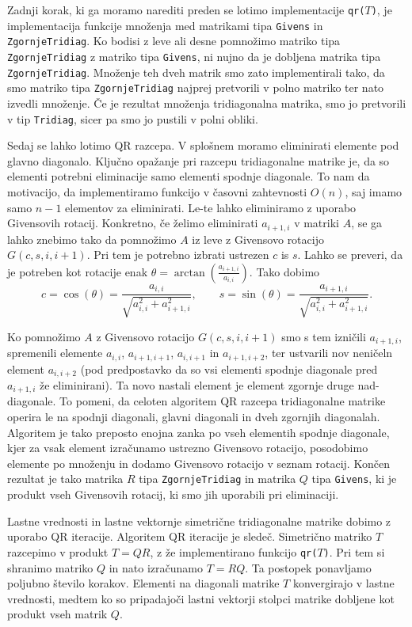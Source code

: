 \documentclass[11pt, titlepage]{article}
\begin{document}
Zadnji korak, ki ga moramo narediti preden se lotimo implementacije \texttt{qr($T$)}, je implementacija funkcije množenja med matrikami tipa \texttt{Givens} in \texttt{ZgornjeTridiag}. Ko bodisi z leve ali desne pomnožimo matriko tipa \texttt{ZgornjeTridiag}
z matriko tipa \texttt{Givens}, ni nujno da je dobljena matrika tipa \texttt{ZgornjeTridiag}. Množenje teh dveh matrik smo zato implementirali tako, da smo matriko tipa \texttt{ZgornjeTridiag} najprej pretvorili v polno matriko ter
nato izvedli množenje. Če je rezultat množenja tridiagonalna matrika, smo jo pretvorili v tip \texttt{Tridiag}, sicer pa smo jo pustili v polni obliki.

Sedaj se lahko lotimo QR razcepa. V splošnem moramo eliminirati elemente pod glavno diagonalo. Ključno opažanje pri razcepu tridiagonalne matrike je, da so elementi potrebni eliminacije samo elementi spodnje diagonale.
To nam da motivacijo, da implementiramo funkcijo v časovni zahtevnosti $O(n)$, saj imamo samo $n-1$ elementov za eliminirati. Le-te lahko eliminiramo z uporabo Givensovih rotacij.
Konkretno, če želimo eliminirati $a_{i+1,i}$ v matriki $A$, se ga lahko znebimo tako da pomnožimo $A$ iz leve z Givensovo rotacijo $G(c,s,i,i+1)$. Pri tem je potrebno izbrati ustrezen $c$ is $s$.
Lahko se preveri, da je potreben kot rotacije enak $\theta = \arctan\left(\frac{a_{i+1,i}}{a_{i,i}}\right)$. Tako dobimo
$$
c = \cos(\theta) = \frac{a_{i,i}}{\sqrt{a_{i,i}^2 + a_{i+1,i}^2}}, \qquad s = \sin(\theta) = \frac{a_{i+1,i}}{\sqrt{a_{i,i}^2 + a_{i+1,i}^2}}.
$$ 

Ko pomnožimo $A$ z Givensovo rotacijo $G(c,s,i,i+1)$ smo s tem izničili $a_{i+1,i}$, spremenili elemente $a_{i,i}$, $a_{i+1,i+1}$, $a_{i,i+1}$ in $a_{i+1,i+2}$, ter ustvarili nov neničeln element $a_{i,i+2}$ (pod predpostavko da so vsi elementi spodnje diagonale pred $a_{i+1,i}$ že eliminirani). Ta novo nastali element je element zgornje druge nad-diagonale.
To pomeni, da celoten algoritem QR razcepa tridiagonalne matrike operira le na spodnji diagonali, glavni diagonali in dveh zgornjih diagonalah.
Algoritem je tako preposto enojna zanka po vseh elementih spodnje diagonale, kjer za vsak element izračunamo ustrezno Givensovo rotacijo, posodobimo elemente po množenju in dodamo Givensovo rotacijo v seznam rotacij.
Končen rezultat je tako matrika $R$ tipa \texttt{ZgornjeTridiag} in matrika $Q$ tipa \texttt{Givens}, ki je produkt vseh Givensovih rotacij, ki smo jih uporabili pri eliminaciji.

Lastne vrednosti in lastne vektornje simetrične tridiagonalne matrike dobimo z uporabo QR iteracije. Algoritem QR iteracije je sledeč. Simetrično matriko $T$ razcepimo v produkt $T = QR$, z že implementirano funkcijo \texttt{qr($T$)}.
Pri tem si shranimo matriko $Q$ in nato izračunamo $T = RQ$. Ta postopek ponavljamo poljubno število korakov. Elementi na diagonali matrike $T$ konvergirajo v lastne vrednosti, medtem ko so pripadajoči lastni vektorji stolpci matrike dobljene kot produkt vseh matrik $Q$.
\end{document}
